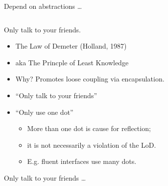 \documentclass{beamer}
\begin{document}
\begin{frame}{Depend on abstractions \ldots}
    \vspace{0cm}
    \begin{columns}
        \column{\dimexpr\paperwidth-40pt}
        
    \end{columns}
\end{frame}

\begin{frame}{Only talk to your friends.}
    \begin{itemize}
        \item The Law of Demeter (Holland, 1987)
        \item aka The Princple of Least Knowledge
        \item Why? Promotes loose coupling via encapsulation.
        \item ``Only talk to your friends''
        \item ``Only use one dot'' 
            \begin{itemize}
                \item More than one dot is cause for reflection; 
                \item it is not necessarily a violation of the LoD.
                \item E.g. fluent interfaces use many dots.
            \end{itemize}
    \end{itemize}
\end{frame}

\begin{frame}{Only talk to your friends \ldots}
    \vspace{0cm}
    \begin{columns}
        \column{\dimexpr\paperwidth-40pt}
        
    \end{columns}
\end{frame}
\end{document}
